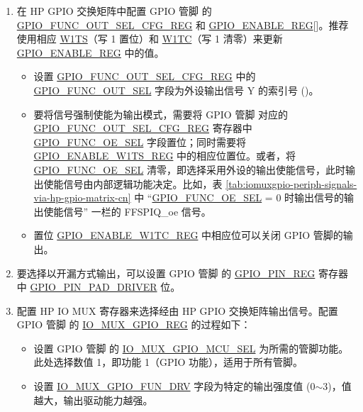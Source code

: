 \documentclass[main\_\_CN.tex]{subfiles}
\begin{document}
\begin{enumerate}
    \item 在 HP GPIO 交换矩阵中配置 GPIO 管脚  的 \hyperref[regdesc:GPIOFUNCNOUTSELCFGREG]{GPIO\_FUNC\_OUT\_SEL\_CFG\_REG} 和 \hyperref[regdesc:GPIOENABLEREG]{GPIO\_ENABLE\_REG}[]。推荐使用相应 \hyperref[regdesc:GPIOENABLEW1TSREG]{W1TS}（写 1 置位）和 \hyperref[regdesc:GPIOENABLEW1TCREG]{W1TC}（写 1 清零）来更新 \hyperref[regdesc:GPIOENABLEREG]{GPIO\_ENABLE\_REG} 中的值。


    \begin{itemize}
        \item 设置 \hyperref[regdesc:GPIOFUNCNOUTSELCFGREG]{GPIO\_FUNC\_OUT\_SEL\_CFG\_REG} 中的 \hyperref[fielddesc:GPIOFUNCNOUTSEL]{GPIO\_FUNC\_OUT\_SEL} 字段为外设输出信号 Y 的索引号 ()。
        \item 要将信号强制使能为输出模式，需要将 GPIO 管脚  对应的 \hyperref[regdesc:GPIOFUNCNOUTSELCFGREG]{GPIO\_FUNC\_OUT\_SEL\_CFG\_REG} 寄存器中 \hyperref[fielddesc:GPIOFUNCNOESEL]{GPIO\_FUNC\_OE\_SEL} 字段置位；同时需要将 \hyperref[regdesc:GPIOENABLEW1TSREG]{GPIO\_ENABLE\_W1TS\_REG} 中的相应位置位。或者，将 \hyperref[fielddesc:GPIOFUNCNOESEL]{GPIO\_FUNC\_OE\_SEL} 清零，即选择采用外设的输出使能信号，此时输出使能信号由内部逻辑功能决定。比如，表 \ref{tab:iomuxgpio-periph-signals-via-hp-gpio-matrix-cn} 中 “\hyperref[fielddesc:GPIOFUNCNOESEL]{GPIO\_FUNC\_OE\_SEL} = 0 时输出信号的输出使能信号” 一栏的 FFSPIQ\_oe 信号。
       \item 置位 \hyperref[regdesc:GPIOENABLEW1TCREG]{GPIO\_ENABLE\_W1TC\_REG} 中相应位可以关闭 GPIO 管脚的输出。
    \end{itemize}
    \item 要选择以开漏方式输出，可以设置 GPIO 管脚  的 \hyperref[regdesc:GPIOPINNREG]{GPIO\_PIN\_REG} 寄存器中 \hyperref[fielddesc:GPIOPINNPADDRIVER]{GPIO\_PIN\_PAD\_DRIVER} 位。
    \item 配置 HP IO MUX 寄存器来选择经由 HP GPIO 交换矩阵输出信号。配置 GPIO 管脚  的 \hyperref[regdesc:IOMUXGPIONREG]{IO\_MUX\_GPIO\_REG} 的过程如下：
    \begin{itemize}
        \item 设置 GPIO 管脚  的 \hyperref[fielddesc:IOMUXGPIONMCUSEL]{IO\_MUX\_GPIO\_MCU\_SEL} 为所需的管脚功能。此处选择数值 1，即功能 1（GPIO 功能），适用于所有管脚。
        \item 设置 \hyperref[fielddesc:IOMUXGPIONFUNDRV]{IO\_MUX\_GPIO\_FUN\_DRV} 字段为特定的输出强度值 (0$\sim$3)，值越大，输出驱动能力越强。

\end{itemize}
\end{enumerate}
\end{document}
